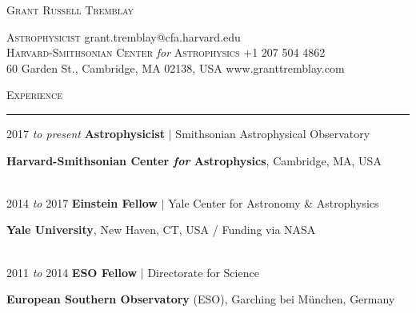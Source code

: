 \documentclass[11pt]{article}
\makeatletter
\def\vhrulefill#1{\leavevmode\leaders\hrule\@height#1\hfill \kern\z@}
\makeatother
\begin{document}
\thispagestyle{empty}

\begin{center}
\hspace*{0.5in}
{\Large \textsc{Grant Russell Tremblay}}\\
\end{center}
{\small
\hspace*{6mm}\textsc{Astrophysicist} \hfill grant.tremblay@cfa.harvard.edu\\
\hspace*{6mm}\textsc{Harvard-Smithsonian Center} \textit{for} \textsc{Astrophysics} \hfill +1 207 504 4862 \\
\hspace*{6mm}60 Garden St., Cambridge, MA 02138, USA \hfill www.granttremblay.com\\}



\textsc{Experience} \vhrulefill{0.4pt}


\vspace{2mm}


\hspace{2.5mm} 2017 \textit{to present} \hspace{13.5mm} \textbf{Astrophysicist} $|$ Smithsonian Astrophysical Observatory

\hspace{42mm} \parbox{5.15in}{ \textbf{Harvard-Smithsonian Center \textit{for} Astrophysics}, Cambridge, MA, USA}\\


\hspace{2.5mm} 2014 \textit{to} 2017 \hspace{17mm} \textbf{Einstein Fellow}
$|$ Yale Center for Astronomy \& Astrophysics

\hspace{42mm} \parbox{5.15in}{\textbf{Yale University}, New Haven, CT, USA / Funding via NASA}\\



\hspace{2.5mm} 2011 \textit{to} 2014 \hspace{17mm} \textbf{ESO Fellow} $|$ Directorate for Science

\hspace{42mm} \parbox{5.15in}{\textbf{European Southern Observatory} (ESO), Garching bei M\"{u}nchen, Germany}\\
\end{document}
